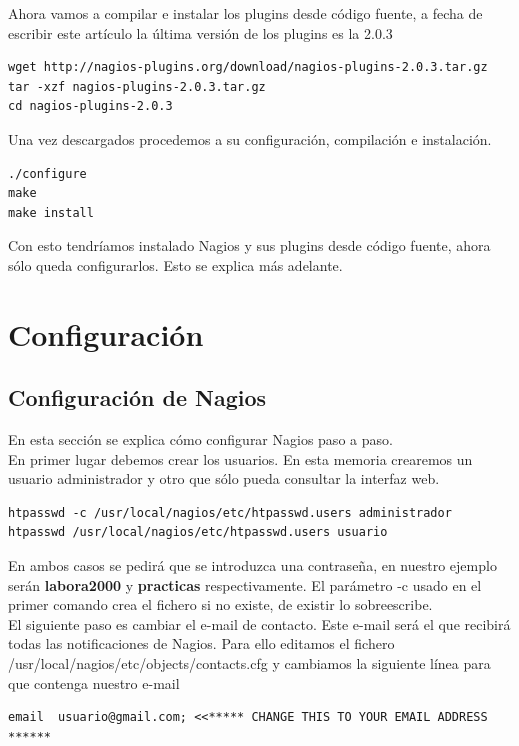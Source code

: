 \documentclass[11pt,a4paper]{article}
\begin{document}
Ahora vamos a compilar e instalar los plugins desde código fuente, a fecha de escribir este artículo la última versión de los plugins es la 2.0.3

\begin{verbatim}
wget http://nagios-plugins.org/download/nagios-plugins-2.0.3.tar.gz
tar -xzf nagios-plugins-2.0.3.tar.gz
cd nagios-plugins-2.0.3
\end{verbatim}

Una vez descargados procedemos a su configuración, compilación e instalación.

\begin{verbatim}
./configure
make
make install
\end{verbatim}

Con esto tendríamos instalado Nagios y sus plugins desde código fuente, ahora sólo queda configurarlos. Esto se explica más adelante.

\section{Configuración}

\subsection{Configuración de Nagios}
En esta sección se explica cómo configurar Nagios paso a paso.
\\

En primer lugar debemos crear los usuarios. En esta memoria crearemos un usuario administrador y otro que sólo pueda consultar la interfaz web.

\begin{verbatim}
htpasswd -c /usr/local/nagios/etc/htpasswd.users administrador
htpasswd /usr/local/nagios/etc/htpasswd.users usuario
\end{verbatim}

En ambos casos se pedirá que se introduzca una contraseña, en nuestro ejemplo serán \textbf{labora2000} y \textbf{practicas} respectivamente. El parámetro -c usado en el primer comando crea el fichero si no existe, de existir lo sobreescribe.
\\

El siguiente paso es cambiar el e-mail de contacto. Este e-mail será el que recibirá todas las notificaciones de Nagios. Para ello editamos el fichero /usr/local/nagios/etc/objects/contacts.cfg y cambiamos la siguiente línea para que contenga nuestro e-mail

\begin{verbatim}
email  usuario@gmail.com; <<***** CHANGE THIS TO YOUR EMAIL ADDRESS ******
\end{verbatim}
\end{document}
